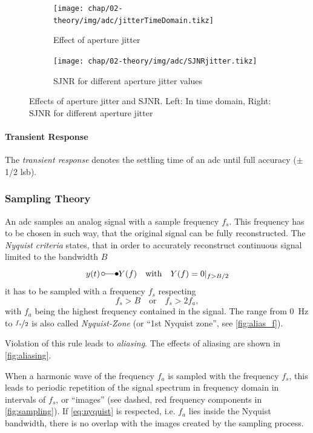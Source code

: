 \begin{figure}[tb]
	\centering
	\begin{subfigure}{0.48\textwidth}
		\centering
		\texttt{[image: chap/02-theory/img/adc/jitterTimeDomain.tikz]}  
		\caption{Effect of aperture jitter}
		\label{fig:jitter}
	\end{subfigure}
	\hfill
	\begin{subfigure}{0.48\textwidth}
		\centering
		\texttt{[image: chap/02-theory/img/adc/SJNRjitter.tikz]}  
		\caption{SJNR for different aperture jitter values}
		\label{fig:sjnr}
	\end{subfigure}
	\caption[Aperture jitter and SJNR]{Effects of aperture jitter and SJNR. Left: In time domain, Right: SJNR for different aperture jitter \cite{Lundberg}}
	\label{fig:ap_jit}
\end{figure}

\paragraph{Transient Response}
The \textit{transient response} denotes the settling time of an \gls{adc} until full accuracy ($\pm$ 1/2 \gls{lsb}).


\subsubsection{Sampling Theory}
An \gls{adc} samples an analog signal with a sample frequency $f_s$.
This frequency has to be chosen in such way, that the original signal can be fully reconstructed.
The \textit{Nyquist criteria} states, that in order to accurately reconstruct continuous signal limited to the bandwidth $B$
\begin{equation}
	y (t) \, \laplace  Y(f) \quad \text{with} \quad Y(f)=0\vert_{f>B/2}
\end{equation} 
it has to be sampled with a frequency $f_s$ respecting
\begin{equation} \label{eq:nyquist}
	f_s > B \quad \text{or} \quad f_s > 2 f_a,
\end{equation}
with $f_a$ being the highest frequency contained in the signal. \cite{walt,puente2015}
The range from \SI{0}{\Hz} to $\nicefrac{f_s}{2}$ is also called \textit{Nyquist-Zone} (or ``1st Nyquist zone'', see \autoref{fig:alias_f}).


Violation of this rule leads to \textit{aliasing}.
The effects of aliasing are shown in \autoref{fig:aliasing}.

When a harmonic wave of the frequency $f_a$ is sampled with the frequency $f_s$, this leads to periodic repetition of the signal spectrum in frequency domain in intervals of $f_s$, or ``images'' (see dashed, red frequency components in \autoref{fig:sampling}). 
If \autoref{eq:nyquist} is respected, i.e. $f_a$ lies inside the Nyquist bandwidth, there is no overlap with the images created by the sampling process.

